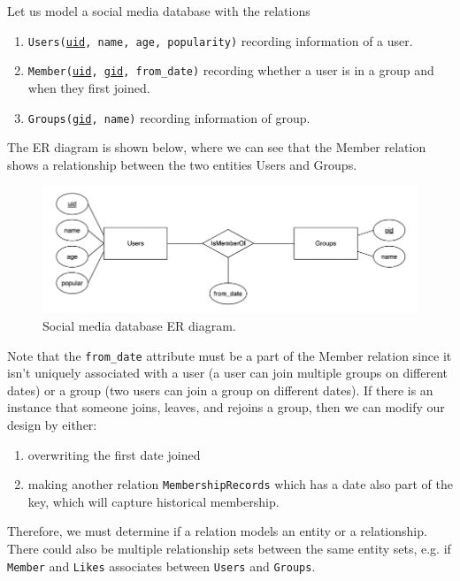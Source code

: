    \begin{example}[E/R Diagram]
      Let us model a social media database with the relations 
      \begin{enumerate}
        \item \texttt{Users(\underline{uid}, name, age, popularity)} recording information of a user. 
        \item \texttt{Member(\underline{uid}, \underline{gid}, from\_date)} recording whether a user is in a group and when they first joined. 
        \item \texttt{Groups(\underline{gid}, name)} recording information of group. 
      \end{enumerate}
      The ER diagram is shown below, where we can see that the Member relation shows a relationship between the two entities Users and Groups. 

      \begin{figure}[H]
        \centering 
        \includegraphics[scale=0.4]{img/social_media.png}
        \caption{Social media database ER diagram.} 
        \label{fig:social_media}
      \end{figure}

      Note that the \texttt{from\_date} attribute must be a part of the Member relation since it isn't uniquely associated with a user (a user can join multiple groups on different dates) or a group (two users can join a group on different dates). If there is an instance that someone joins, leaves, and rejoins a group, then we can modify our design by either: 
      \begin{enumerate}
        \item overwriting the first date joined 
        \item making another relation \texttt{MembershipRecords} which has a date also part of the key, which will capture historical membership.  
      \end{enumerate}
    \end{example}

    Therefore, we must determine if a relation models an entity or a relationship. There could also be multiple relationship sets between the same entity sets, e.g. if \texttt{Member} and \texttt{Likes} associates between \texttt{Users} and \texttt{Groups}. 

